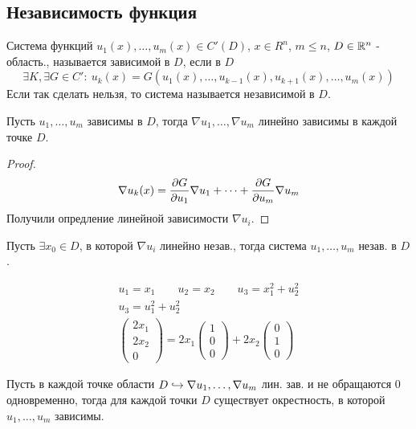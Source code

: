 \documentclass{article}
\begin{document}
\subsection{Независимость функция}
\begin{definition}
Система функций $u_1(x),\dots ,u_m(x)\in C'(D)$, $x\in R^{n}$, $m \le n$, $D \in \mathbb{R}^{n}$
- область., называется зависимой в $D$, если в $D$
\[
  \exists K, \exists G \in C': \: u_k(x)=G(u_1(x),\dots , u_{k-1}(x), u_{k+1}(x),\dots ,u_m(x))
\]
Если так сделать нельзя, то система называется независимой в $D$.
\end{definition}
\begin{theorem}
  Пусть $u_1,\dots ,u_m$ зависимы в $D$, тогда $\nabla u_1,\dots , \nabla u_m$
  линейно зависимы в каждой точке $D$.
\end{theorem}
\begin{proof}
  \begin{gather*}
    \nabla u_k(x)=\frac{\partial{G}}{\partial{u_1}}\nabla u_1+\dots +\frac{\partial{G}}{\partial{u_m}}\nabla u_m
  \end{gather*}
  Получили опредление линейной зависимости $\nabla u_i$.
\end{proof}
\begin{corollary}
  Пусть $\exists x_0\in D$, в которой $\nabla u_i$ линейно незав.,
  тогда система $u_1,\dots, u_m$ незав. в $D$.
\end{corollary}
\begin{eg}
  \begin{gather*}
    u_1=x_1 \qquad u_2=x_2 \qquad u_3=x_1^{2}+u_2^{2} \\ 
    u_3=u_1^{2}+u_2^{2} \\ 
    \begin{pmatrix}
      2x_1 \\ 2x_2 \\ 0
    \end{pmatrix} = 2x_1 \begin{pmatrix}
      1 \\ 0 \\ 0
    \end{pmatrix} + 2x_2 \begin{pmatrix}
      0 \\ 1 \\ 0
    \end{pmatrix}
  \end{gather*}
\end{eg}
\begin{theorem}
  Пусть в каждой точке области $D \hookrightarrow \nabla u_1,\dots ,\nabla u_m$ лин. зав.
  и не обращаются $0$ одновременно, тогда для каждой точки $D$
  существует окрестность, в которой $u_1, \dots ,u_m$ зависимы.
\end{theorem}
\end{document}
